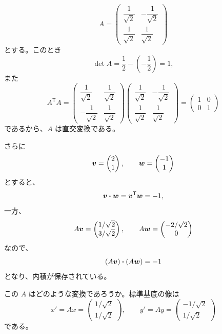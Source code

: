 \begin{example}
\begin{equation}
 A=\begin{pmatrix}
 \dfrac1{\sqrt2}&-\dfrac1{\sqrt2}\\[2mm]
 \dfrac1{\sqrt2}& \dfrac1{\sqrt2}
 \end{pmatrix}
\end{equation}
とする。このとき
\[
 \det A=\frac12-\left(-\frac12\right)=1,
\]
また
\[
 A^{\mathsf T}A
 =\begin{pmatrix}
 \dfrac1{\sqrt2}&\dfrac1{\sqrt2}\\[2mm]
 -\dfrac1{\sqrt2}&\dfrac1{\sqrt2}
 \end{pmatrix}
 \begin{pmatrix}
 \dfrac1{\sqrt2}&-\dfrac1{\sqrt2}\\[2mm]
 \dfrac1{\sqrt2}&\dfrac1{\sqrt2}
 \end{pmatrix}
 =\begin{pmatrix}1&0\\0&1\end{pmatrix}
\]
であるから、$A$ は直交変換である。

さらに
\[
 \bm{v}=\begin{pmatrix}2\\1\end{pmatrix},\qquad
 \bm{w}=\begin{pmatrix}-1\\1\end{pmatrix}
\]
とすると、
\[
 \bm{v}\mathbin{\boldsymbol{\cdot}}\bm{w}
 =\bm{v}^{\mathsf T}\bm{w}=-1,
\]
一方、
\[
 A\bm{v}=\begin{pmatrix}1/\sqrt2\\3/\sqrt2\end{pmatrix},\qquad
 A\bm{w}=\begin{pmatrix}-2/\sqrt2\\0\end{pmatrix}
\]
なので、
\[
 (A\bm{v})\mathbin{\boldsymbol{\cdot}}(A\bm{w})=-1
\]
となり、内積が保存されている。
\end{example}

この $A$ はどのような変換であろうか。標準基底の像は
\[
 \unit{x}'=A\unit{x}
 =\begin{pmatrix}1/\sqrt2\\1/\sqrt2\end{pmatrix},\qquad
 \unit{y}'=A\unit{y}
 =\begin{pmatrix}-1/\sqrt2\\1/\sqrt2\end{pmatrix}
\]
である。

